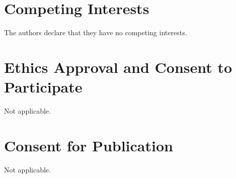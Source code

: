 \documentclass[pdflatex,sn-mathphys-num]{sn-jnl}
\theoremstyle{thmstyleone}
\theoremstyle{thmstyletwo}
\theoremstyle{thmstylethree}
\begin{document}
\section*{Competing Interests}

The authors declare that they have no competing interests.

\section*{Ethics Approval and Consent to Participate}

Not applicable.

\section*{Consent for Publication}

Not applicable.
\end{document}

